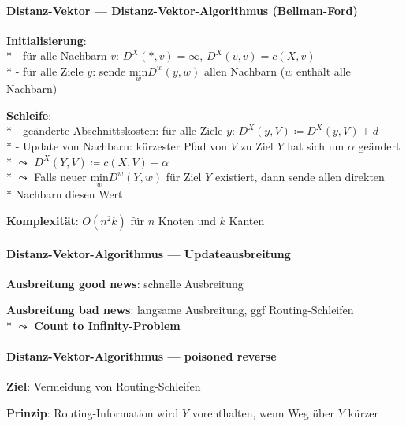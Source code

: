\paragraph{Distanz-Vektor --- Distanz-Vektor-Algorithmus (Bellman-Ford)}
\begin{items}
  \item \textbf{Initialisierung}: \\*
    - für alle Nachbarn \( v \): \( D^X(*,v) = \infty \), \( D^X(v,v) = c(X,v) \) \\*
    - für alle Ziele \( y \): sende \( \underset{w}{\text{min}}D^w(y,w) \) allen Nachbarn (\( w \) enthält alle Nachbarn)
  \item \textbf{Schleife}: \\*
    - geänderte Abschnittskosten: für alle Ziele \( y \): \( D^X(y,V) \coloneqq D^X(y,V) + d \) \\*
    - Update von Nachbarn: kürzester Pfad von \( V \) zu Ziel \( Y \) hat sich um \( \alpha \) geändert \\*
    \phantom{-} \( \leadsto \) \( D^X(Y,V) \coloneqq c(X,V) + \alpha \) \\*
    \phantom{-} \( \leadsto \) Falls neuer \( \underset{w}{\text{min}}D^w(Y,w) \) für Ziel \( Y \) existiert, dann sende allen direkten \\* \phantom{-} \phantom{\( \leadsto \)} Nachbarn diesen Wert
  \item \textbf{Komplexität}: \( O(n^2k) \) für \( n \) Knoten und \( k \) Kanten
\end{items}

\paragraph{Distanz-Vektor-Algorithmus --- Updateausbreitung}
\begin{items}
  \item \textbf{Ausbreitung good news}: schnelle Ausbreitung
  \item \textbf{Ausbreitung bad news}: langsame Ausbreitung, ggf Routing-Schleifen \\*
    \( \leadsto \) \textbf{Count to Infinity-Problem}
\end{items}

\paragraph{Distanz-Vektor-Algorithmus --- poisoned reverse}
\begin{items}
  \item \textbf{Ziel}: Vermeidung von Routing-Schleifen
  \item \textbf{Prinzip}: Routing-Information wird \( Y \) vorenthalten, wenn Weg über \( Y \) kürzer
\end{items}

